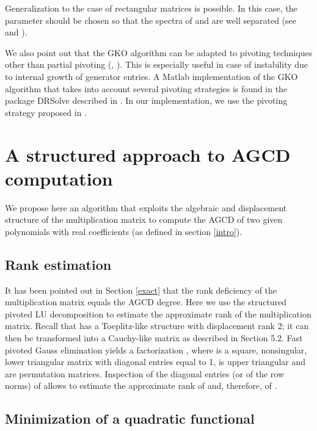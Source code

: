 \documentclass{article}
\begin{document}
Generalization to the case of  rectangular matrices is possible.
In this case, the parameter  should be chosen so that the spectra
of  and  are well separated (see {\cite{AR}} and {\cite{BB}}).

We also point out that the GKO algorithm can be adapted to pivoting techniques
other than partial pivoting ({\cite{Gu}}, {\cite{Ste}}). This is especially
useful in case of instability due to internal growth of generator entries. A
Matlab implementation of the GKO algorithm that takes into account several
pivoting strategies is found in the package DRSolve described in {\cite{AR}}.
In our implementation, we use the pivoting strategy proposed in {\cite{Gu}}.

\section{A structured approach to AGCD computation}

We propose here an algorithm that exploits the algebraic and displacement
structure of the multiplication matrix to compute the AGCD of two given
polynomials with real coefficients (as defined in section \ref{intro}).

\subsection{Rank estimation}

It has been pointed out in Section \ref{exact} that the rank deficiency of the
multiplication matrix equals the AGCD degree. Here we use the structured
pivoted LU decomposition to estimate the approximate rank of the
multiplication matrix. Recall that  has a Toeplitz-like structure with
displacement rank 2; it can then be transformed into a Cauchy-like matrix
 as described in Section 5.2. Fast pivoted Gauss elimination yields
a factorization , where  is a square, nonsingular,
lower triangular matrix with diagonal entries equal to 1,  is upper
triangular and  are permutation matrices. Inspection of the diagonal
entries (or of the row norms) of  allows to estimate the approximate rank
of  and, therefore, of .

\subsection{Minimization of a quadratic functional}
\end{document}
